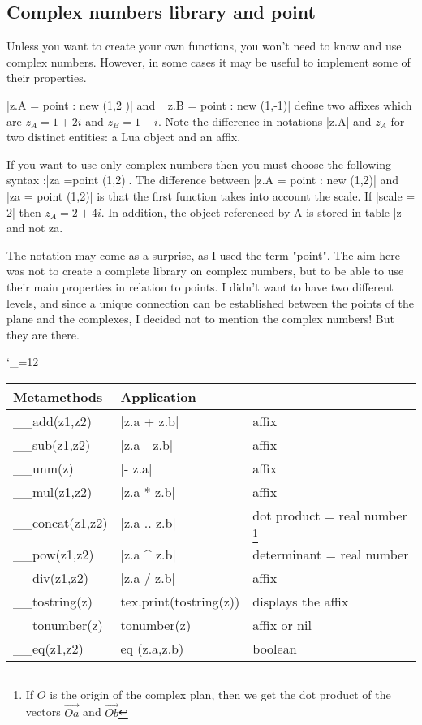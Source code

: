 \subsection{Complex numbers library and point} %
\label{sub:complex_numbers}

Unless you want to create your own functions, you won't need to know and use complex numbers. However, in some cases it may be useful to implement some of their properties.


|z.A =  point : new (1,2 )| and \ |z.B = point : new (1,-1)| define two affixes which are $z_A = 1+2i$ and $z_B = 1-i$. Note the difference in notations |z.A| and $z_A$ for two distinct entities: a Lua object and an affix. 

\vspace{1em}
If you want to use only complex numbers then you must choose the following syntax :|za =point (1,2)|.
The difference between |z.A = point : new (1,2)| and |za = point (1,2)| is that the first function takes into account the scale. If |scale = 2| then $z_A = 2+4i$. In addition, the object referenced by A is stored in table |z| and not za.

 The notation may come as a surprise, as I used the term "point". The aim here was not to create a complete library on complex numbers, but to be able to use their main properties in relation to points. I didn't want to have two different levels, and since a unique connection can be established between the points of the plane and the complexes, I decided not to mention the complex numbers! But they are there.


\bgroup
\catcode`_=12
\small

\begin{minipage}{\textwidth}
\begin{tabular}{lll}
  \toprule
  \textbf{Metamethods} & \textbf{Application} \\
  \midrule
\_\_add(z1,z2)   & |z.a + z.b| & affix \\
\_\_sub(z1,z2)   & |z.a - z.b| & affix\\
\_\_unm(z)       & |- z.a| & affix\\
\_\_mul(z1,z2)   & |z.a * z.b|  &  affix\\
\_\_concat(z1,z2)& |z.a .. z.b| & dot product  = real number \footnote{If $O$ is the origin of the complex plan, then we get the dot product of the vectors $\overrightarrow{Oa}$ and $\overrightarrow{Ob}$} \\
\_\_pow(z1,z2)   & |z.a ^ z.b| & determinant = real number\\
\_\_div(z1,z2)   & |z.a / z.b|   &   affix     \\
\_\_tostring(z)  & tex.print(tostring(z)) & displays the affix   \\
\_\_tonumber(z)  & tonumber(z) & affix or nil\\
\_\_eq(z1,z2)    &  eq (z.a,z.b) & boolean\\
\bottomrule
\end{tabular}
\end{minipage}
\egroup

